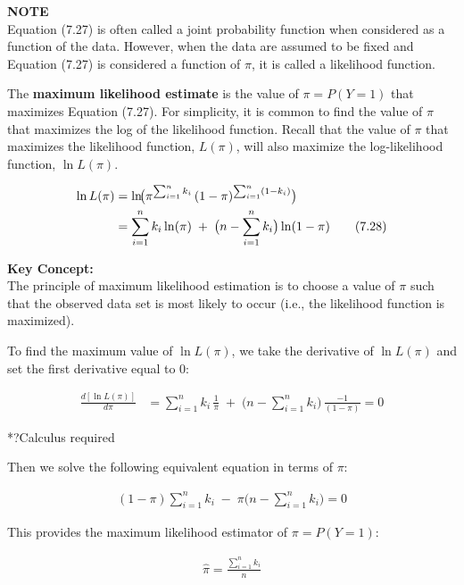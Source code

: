 \documentclass[
]{report}
\begin{document}
\large

\textbf{NOTE}\\
Equation (7.27) is often called a joint probability function when considered as a function of the data. However, when the data are assumed to be fixed and Equation (7.27) is considered a function of \(\pi\), it is called a likelihood function.\\
\normalsize

The \textbf{maximum likelihood estimate} is the value of \(\pi = P(Y = 1)\) that maximizes Equation (7.27). For simplicity, it is common to find the value of \(\pi\) that maximizes the log of the likelihood function. Recall that the value of \(\pi\) that maximizes the likelihood function, \(L(\pi)\), will also maximize the log-likelihood function, \(\ln L(\pi)\).

\begin{align}
\ln L(\pi)
&= \ln\!\bigl(\pi^{\sum_{i=1}^n k_i}\,(1 - \pi)^{\sum_{i=1}^n (1 - k_i)}\bigr) \notag \\
&= \sum_{i=1}^n k_i \ln(\pi)\;+\;\bigl(n - \sum_{i=1}^n k_i\bigr)\ln(1 - \pi)
\tag{7.28}
\end{align}

\large

\textbf{Key Concept:}\\
The principle of maximum likelihood estimation is to choose a value of \(\pi\) such that the observed data set is most likely to occur (i.e., the likelihood function is maximized).\\
\normalsize

To find the maximum value of \(\ln L(\pi)\), we take the derivative of \(\ln L(\pi)\) and set the first derivative equal to 0:

\begin{align}
\frac{d[\ln L(\pi)]}{d\pi}
&= \sum_{i=1}^n k_i \,\frac{1}{\pi} \;+\;\bigl(n - \sum_{i=1}^n k_i\bigr)\,\frac{-1}{(1 - \pi)} = 0
\tag{7.29}
\end{align}

*?Calculus required

Then we solve the following equivalent equation in terms of \(\pi\):

\begin{align}
(1 - \pi)\sum_{i=1}^n k_i \;-\;\pi\bigl(n - \sum_{i=1}^n k_i\bigr) = 0
\tag{7.30}
\end{align}

This provides the maximum likelihood estimator of \(\pi = P(Y = 1)\):

\begin{align}
\displaystyle \hat{\pi} = \frac{\sum_{i=1}^n k_i}{n}
\tag{7.31}
\end{align}
\end{document}

